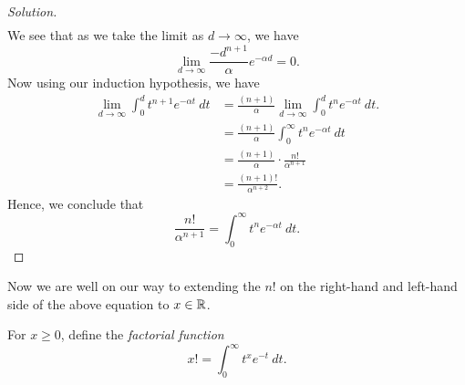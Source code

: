 \begin{enumerate}
\begin{proof}[Solution]
\begin{align*}
        \end{align*}
        We see that as we take the limit as \( d \to \infty  \), we have 
        \[  \lim_{ d \to \infty  }  \frac{  - d^{n+1} }{ \alpha } e^{- \alpha d } = 0.\] Now using our induction hypothesis, we have 
        \begin{align*}
            \lim_{ d \to \infty  } \int_{ 0 }^{ d  } t^{n+1} e^{ - \alpha t } \ dt &= \frac{ (n+1)  }{ \alpha }  \lim_{ d \to \infty  } \int_{ 0 }^{ d }  t^{n} e^{ - \alpha t } \  dt.    \\
                                                                                   &= \frac{ (n+1)  }{ \alpha }  \int_{ 0 }^{ \infty  }  t^{n} e^{- \alpha t } \ dt \\
                                                                                   &= \frac{ (n+1)  }{ \alpha } \cdot \frac{ n!  }{ \alpha^{n+1}  } \\
                                                                                   &= \frac{ (n+1)!  }{ \alpha^{n+2} }.
        \end{align*}
        Hence, we conclude that 
        \[ \frac{ n!  }{ \alpha^{n+1} } =  \int_{ 0 }^{ \infty  }  t^{n} e^{ - \alpha t } \ dt.\]  
        \end{proof}
\end{enumerate}

Now we are well on our way to extending the \( n!  \) on the right-hand and left-hand side of the above equation to \( x \in \mathbb{R}  \).

\begin{definition}
    For \( x \geq 0  \), define the \textit{factorial function} 
    \[  x! = \int_{ 0 }^{ \infty  } t^{x} e^{-t} \ dt. \]
\end{definition}

